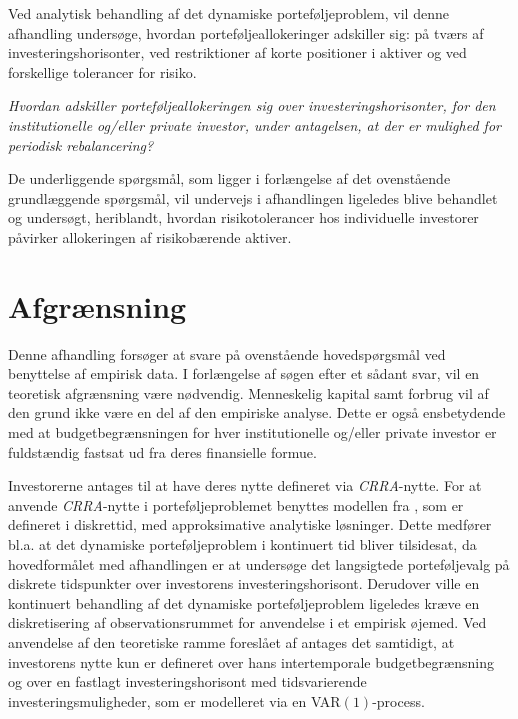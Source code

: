 \documentclass[
  a4paper,
  oneside]{memoir}
\begin{document}
Ved analytisk behandling af det dynamiske porteføljeproblem, vil denne afhandling undersøge, hvordan porteføljeallokeringer adskiller sig: på tværs af investeringshorisonter, ved restriktioner af korte positioner i aktiver og ved forskellige tolerancer for risiko.

\begin{center}
\textit{Hvordan adskiller porteføljeallokeringen sig over investeringshorisonter, for den institutionelle og/eller private investor, under antagelsen, at der er mulighed for periodisk rebalancering?}
\end{center}

De underliggende spørgsmål, som ligger i forlængelse af det ovenstående grundlæggende spørgsmål, vil undervejs i afhandlingen ligeledes blive behandlet og undersøgt, heriblandt, hvordan risikotolerancer hos individuelle investorer påvirker allokeringen af risikobærende aktiver.

\hypertarget{afgruxe6nsning}{%
\section{Afgrænsning}\label{afgruxe6nsning}}

Denne afhandling forsøger at svare på ovenstående hovedspørgsmål ved benyttelse af empirisk data. I forlængelse af søgen efter et sådant svar, vil en teoretisk afgrænsning være nødvendig. Menneskelig kapital samt forbrug vil af den grund ikke være en del af den empiriske analyse. Dette er også ensbetydende med at budgetbegrænsningen for hver institutionelle og/eller private investor er fuldstændig fastsat ud fra deres finansielle formue.

Investorerne antages til at have deres nytte defineret via \emph{CRRA}-nytte. For at anvende \emph{CRRA}-nytte i porteføljeproblemet benyttes modellen fra \citep{JurVic2011}, som er defineret i diskrettid, med approksimative analytiske løsninger. Dette medfører bl.a. at det dynamiske porteføljeproblem i kontinuert tid bliver tilsidesat, da hovedformålet med afhandlingen er at undersøge det langsigtede porteføljevalg på diskrete tidspunkter over investorens investeringshorisont. Derudover ville en kontinuert behandling af det dynamiske porteføljeproblem ligeledes kræve en diskretisering af observationsrummet for anvendelse i et empirisk øjemed. Ved anvendelse af den teoretiske ramme foreslået af \citep{JurVic2011} antages det samtidigt, at investorens nytte kun er defineret over hans intertemporale budgetbegrænsning og over en fastlagt investeringshorisont med tidsvarierende investeringsmuligheder, som er modelleret via en VAR\((1)\)-process.
\end{document}

